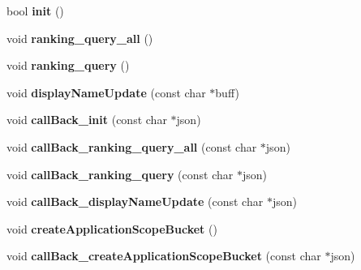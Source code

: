 \begin{DoxyCompactItemize}
\item 
\hypertarget{class_kii_sample_abc9d2035122f1eaf744b7ef2cada7b44}{bool {\bfseries init} ()}\label{class_kii_sample_abc9d2035122f1eaf744b7ef2cada7b44}

\item 
\hypertarget{class_kii_sample_afc07f400f53222a251a27d4bf23b7ebb}{void {\bfseries ranking\-\_\-query\-\_\-all} ()}\label{class_kii_sample_afc07f400f53222a251a27d4bf23b7ebb}

\item 
\hypertarget{class_kii_sample_a1ba083b57f4aaf7699e1a508087d722c}{void {\bfseries ranking\-\_\-query} ()}\label{class_kii_sample_a1ba083b57f4aaf7699e1a508087d722c}

\item 
\hypertarget{class_kii_sample_a340ca5e05871daae6553f584d9577ed3}{void {\bfseries display\-Name\-Update} (const char $\ast$buff)}\label{class_kii_sample_a340ca5e05871daae6553f584d9577ed3}

\item 
\hypertarget{class_kii_sample_a90a707b405580b96be40e2d95990800c}{void {\bfseries call\-Back\-\_\-init} (const char $\ast$json)}\label{class_kii_sample_a90a707b405580b96be40e2d95990800c}

\item 
\hypertarget{class_kii_sample_a7950ab481ecbcd246e11f8be1dec5409}{void {\bfseries call\-Back\-\_\-ranking\-\_\-query\-\_\-all} (const char $\ast$json)}\label{class_kii_sample_a7950ab481ecbcd246e11f8be1dec5409}

\item 
\hypertarget{class_kii_sample_a8a27c1a4268360228e253134b68c782d}{void {\bfseries call\-Back\-\_\-ranking\-\_\-query} (const char $\ast$json)}\label{class_kii_sample_a8a27c1a4268360228e253134b68c782d}

\item 
\hypertarget{class_kii_sample_ab7b076507e2a61ac98ad666aa5f57db8}{void {\bfseries call\-Back\-\_\-display\-Name\-Update} (const char $\ast$json)}\label{class_kii_sample_ab7b076507e2a61ac98ad666aa5f57db8}

\item 
\hypertarget{class_kii_sample_aaf8b0832dd14b2d7d050e679e7c6dbb7}{void {\bfseries create\-Application\-Scope\-Bucket} ()}\label{class_kii_sample_aaf8b0832dd14b2d7d050e679e7c6dbb7}

\item 
\hypertarget{class_kii_sample_a3c2c540c2d87660963f14d9f9f40067a}{void {\bfseries call\-Back\-\_\-create\-Application\-Scope\-Bucket} (const char $\ast$json)}\label{class_kii_sample_a3c2c540c2d87660963f14d9f9f40067a}


\end{DoxyCompactItemize}
